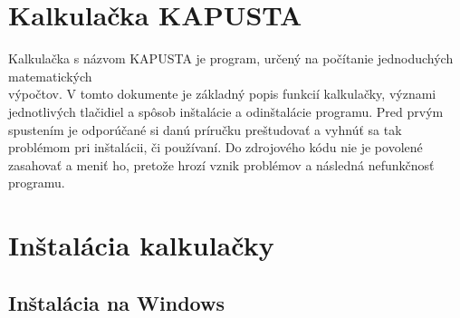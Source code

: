 \documentclass[a4paper, 11pt]{article}
\begin{document}
    \section{Kalkulačka KAPUSTA}
        Kalkulačka s názvom KAPUSTA je program, určený na počítanie jednoduchých matematických\\ výpočtov. V tomto dokumente je základný popis funkcií kalkulačky, význami jednotlivých tlačidiel a spôsob inštalácie a odinštalácie programu. Pred prvým spustením je odporúčané si danú príručku preštudovať a vyhnúť sa tak problémom pri inštalácii, či používaní. Do zdrojového kódu nie je povolené zasahovať a meniť ho, pretože hrozí vznik problémov a následná nefunkčnosť programu.
    
    \newpage
    
    \section{Inštalácia kalkulačky}
        \subsection{Inštalácia na Windows}
\end{document}
